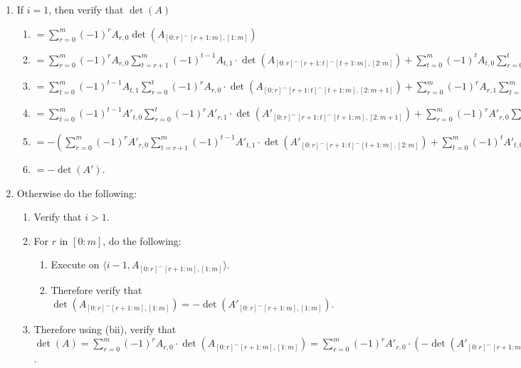 \documentclass[twocolumn]{article}
\newcommand{\procedurehr}[2][]{\hyperref[sec:procedure #2]{\ifthenelse{\equal{#1}{}}{procedure #2}{#1}}}
\begin{document}
				\begin{enumerate}
					\item If $i=1$, then verify that $\det(A)$
					\begin{enumerate}
						\item $=\sum_{r=0}^m (-1)^{r}A_{r,0}\det(A_{[0:r]^\frown[r+1:m],[1:m]})$
						\item $=\sum_{r=0}^m (-1)^{r}A_{r,0}\sum_{t=r+1}^m (-1)^{t-1}A_{t,1}\cdot\det(A_{[0:r]^\frown[r+1:t]^\frown[t+1:m],[2:m]})+\sum_{t=0}^m (-1)^{t}A_{t,0}\sum_{r=0}^{t} (-1)^{r}A_{r,1}\cdot\det(A_{[0:r]^\frown[r+1:t]^\frown[t+1:m],[2:m+1]})$
						\item $=\sum_{t=0}^m (-1)^{t-1}A_{t,1}\sum_{r=0}^{t} (-1)^{r}A_{r,0}\cdot\det(A_{[0:r]^\frown[r+1:t]^\frown[t+1:m],[2:m+1]})+\sum_{r=0}^m (-1)^{r}A_{r,1}\sum_{t=r+1}^m (-1)^{t}A_{t,0}\cdot\det(A_{[0:r]^\frown[r+1:t]^\frown[t+1:m],[2:m+1]})$
						\item $=\sum_{t=0}^m (-1)^{t-1}A'_{t,0}\sum_{r=0}^{t} (-1)^{r}A'_{r,1}\cdot\det(A'_{[0:r]^\frown[r+1:t]^\frown[t+1:m],[2:m+1]})+\sum_{r=0}^m (-1)^{r}A'_{r,0}\sum_{t=r+1}^m (-1)^{t}A'_{t,1}\cdot\det(A'_{[0:r]^\frown[r+1:t]^\frown[t+1:m],[2:m]})$
						\item $=-(\sum_{r=0}^m (-1)^{r}A'_{r,0}\sum_{t=r+1}^m (-1)^{t-1}A'_{t,1}\cdot\det(A'_{[0:r]^\frown[r+1:t]^\frown[t+1:m],[2:m]})+\sum_{t=0}^m (-1)^{t}A'_{t,0}\sum_{r=0}^{t} (-1)^{r}A'_{r,1}\cdot\det(A'_{[0:r]^\frown[r+1:t]^\frown[t+1:m],[2:m]}))$
						\item $=-\det(A')$.
					\end{enumerate}
					\item Otherwise do the following:
					\begin{enumerate}
						\item Verify that $i>1$.
						\item For $r$ in $[0:m]$, do the following:
						\begin{enumerate}
							\item Execute \procedurehr{3.14} on $\langle i-1,A_{[0:r]^\frown[r+1:m],[1:m]}\rangle$.
							\item Therefore verify that $\det(A_{[0:r]^\frown[r+1:m],[1:m]})=-\det(A'_{[0:r]^\frown[r+1:m],[1:m]})$.
						\end{enumerate}
						\item Therefore using (bii), verify that $\det(A)=\sum_{r=0}^m (-1)^{r}A_{r,0}\cdot\det(A_{[0:r]^\frown[r+1:m],[1:m]})=\sum_{r=0}^m (-1)^{r}A'_{r,0}\cdot(-\det(A'_{[0:r]^\frown[r+1:m],[1:m]}))=-\det(A')$.
					\end{enumerate}
				\end{enumerate}
\end{document}
